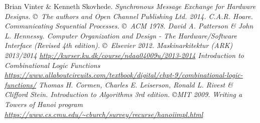 \begin{thebibliography}{9}
     Brian Vinter \& Kenneth Skovhede. \it{Synchronous Message
        Exchange for Hardware Designs}. \copyright\ The authors and Open
        Channel Publishing Ltd. 2014.
     C.A.R. Hoare. \it{Communicating Sequential Processes}.
        \copyright\ ACM 1978.
     David A. Patterson \& John L. Hennessy. \it{Computer
        Organization and Design - The Hardware/Software Interface (Revised 4th
        edition)}.  \copyright\ Elsevier 2012.
     \it{Maskinarkitektur (ARK) 2013/2014}
        \url{http://kurser.ku.dk/course/ndaa04009u/2013-2014}
     Introduction to Combinational Logic Functions
        \url{https://www.allaboutcircuits.com/textbook/digital/chpt-9/combinational-logic-functions/}
     Thomas H. Cormen, Charles E. Leiserson, Ronald L. Rivest
        \& Clifford Stein. \it{Introduction to Algorithms 3rd edition}.
        \copyright MIT 2009.
     Writing a Towers of Hanoi program
        \url{https://www.cs.cmu.edu/~cburch/survey/recurse/hanoiimpl.html}
\end{thebibliography}

